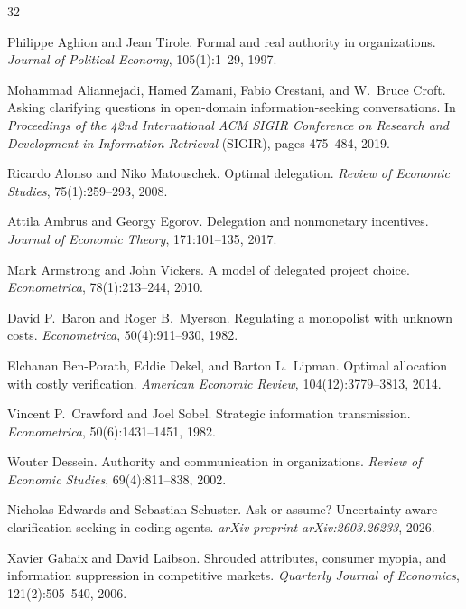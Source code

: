 \documentclass[11pt]{article}
\begin{document}
\begin{thebibliography}{32}

Philippe Aghion and Jean Tirole. Formal and real authority in organizations. \textit{Journal of Political Economy}, 105(1):1--29, 1997.

Mohammad Aliannejadi, Hamed Zamani, Fabio Crestani, and W.\ Bruce Croft.
Asking clarifying questions in open-domain information-seeking conversations.
In \textit{Proceedings of the 42nd International ACM SIGIR Conference on Research and Development in Information Retrieval} (SIGIR),
pages 475--484, 2019.

Ricardo Alonso and Niko Matouschek.
Optimal delegation.
\textit{Review of Economic Studies}, 75(1):259--293, 2008.

Attila Ambrus and Georgy Egorov.
Delegation and nonmonetary incentives.
\textit{Journal of Economic Theory}, 171:101--135, 2017.

Mark Armstrong and John Vickers.
A model of delegated project choice.
\textit{Econometrica}, 78(1):213--244, 2010.

David P.\ Baron and Roger B.\ Myerson. Regulating a monopolist with unknown
costs. \textit{Econometrica}, 50(4):911--930, 1982.

Elchanan Ben-Porath, Eddie Dekel, and Barton L.\ Lipman.
Optimal allocation with costly verification.
\textit{American Economic Review}, 104(12):3779--3813, 2014.

Vincent P.\ Crawford and Joel Sobel. Strategic information transmission.
\textit{Econometrica}, 50(6):1431--1451, 1982.

Wouter Dessein.
Authority and communication in organizations.
\textit{Review of Economic Studies}, 69(4):811--838, 2002.

Nicholas Edwards and Sebastian Schuster.
Ask or assume? Uncertainty-aware clarification-seeking in coding agents.
\textit{arXiv preprint arXiv:2603.26233}, 2026.

Xavier Gabaix and David Laibson.
Shrouded attributes, consumer myopia, and information suppression in competitive markets.
\textit{Quarterly Journal of Economics}, 121(2):505--540, 2006.


\end{thebibliography}
\end{document}
